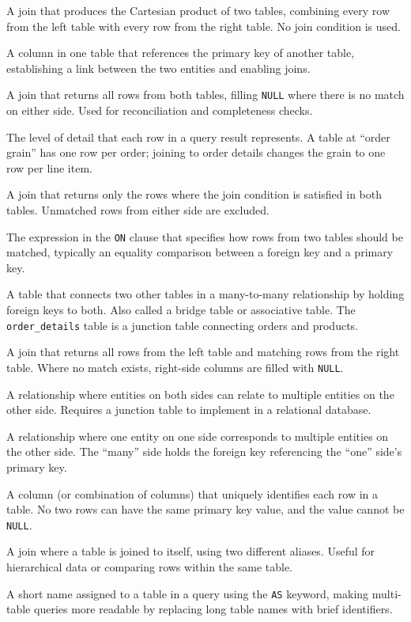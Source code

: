 \documentclass[
  letterpaper,
  DIV=11,
  numbers=noendperiod]{scrreprt}
\providecommand{\tightlist}{%
  \setlength{\itemsep}{0pt}\setlength{\parskip}{0pt}}
\begin{document}
\begin{description}
\tightlist
\item[\textbf{CROSS JOIN}]
A join that produces the Cartesian product of two tables, combining
every row from the left table with every row from the right table. No
join condition is used.
\item[\textbf{Foreign Key}]
A column in one table that references the primary key of another table,
establishing a link between the two entities and enabling joins.
\item[\textbf{FULL OUTER JOIN}]
A join that returns all rows from both tables, filling \texttt{NULL}
where there is no match on either side. Used for reconciliation and
completeness checks.
\item[\textbf{Grain}]
The level of detail that each row in a query result represents. A table
at ``order grain'' has one row per order; joining to order details
changes the grain to one row per line item.
\item[\textbf{INNER JOIN}]
A join that returns only the rows where the join condition is satisfied
in both tables. Unmatched rows from either side are excluded.
\item[\textbf{Join Condition}]
The expression in the \texttt{ON} clause that specifies how rows from
two tables should be matched, typically an equality comparison between a
foreign key and a primary key.
\item[\textbf{Junction Table}]
A table that connects two other tables in a many-to-many relationship by
holding foreign keys to both. Also called a bridge table or associative
table. The \texttt{order\_details} table is a junction table connecting
orders and products.
\item[\textbf{LEFT JOIN}]
A join that returns all rows from the left table and matching rows from
the right table. Where no match exists, right-side columns are filled
with \texttt{NULL}.
\item[\textbf{Many-to-Many Relationship}]
A relationship where entities on both sides can relate to multiple
entities on the other side. Requires a junction table to implement in a
relational database.
\item[\textbf{One-to-Many Relationship}]
A relationship where one entity on one side corresponds to multiple
entities on the other side. The ``many'' side holds the foreign key
referencing the ``one'' side's primary key.
\item[\textbf{Primary Key}]
A column (or combination of columns) that uniquely identifies each row
in a table. No two rows can have the same primary key value, and the
value cannot be \texttt{NULL}.
\item[\textbf{Self-Join}]
A join where a table is joined to itself, using two different aliases.
Useful for hierarchical data or comparing rows within the same table.
\item[\textbf{Table Alias}]
A short name assigned to a table in a query using the \texttt{AS}
keyword, making multi-table queries more readable by replacing long
table names with brief identifiers.
\end{description}
\end{document}
